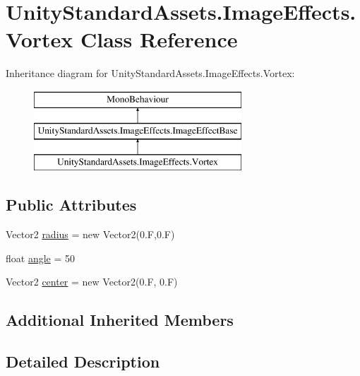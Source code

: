 \hypertarget{class_unity_standard_assets_1_1_image_effects_1_1_vortex}{}\section{Unity\+Standard\+Assets.\+Image\+Effects.\+Vortex Class Reference}
\label{class_unity_standard_assets_1_1_image_effects_1_1_vortex}
Inheritance diagram for Unity\+Standard\+Assets.\+Image\+Effects.\+Vortex\+:\begin{figure}[H]
\begin{center}
\leavevmode
\includegraphics[height=3.000000cm]{class_unity_standard_assets_1_1_image_effects_1_1_vortex}
\end{center}
\end{figure}
\subsection*{Public Attributes}
\begin{DoxyCompactItemize}
\item 
Vector2 \mbox{\hyperlink{class_unity_standard_assets_1_1_image_effects_1_1_vortex_a18d4f90d00b4bf29e009dfb6646a5945}{radius}} = new Vector2(0.\+F,0.\+F)
\item 
float \mbox{\hyperlink{class_unity_standard_assets_1_1_image_effects_1_1_vortex_a58c4a65228a790d11ee0cc53f4695ac5}{angle}} = 50
\item 
Vector2 \mbox{\hyperlink{class_unity_standard_assets_1_1_image_effects_1_1_vortex_aa82b55b306c932271da37a1f23ef9915}{center}} = new Vector2(0.\+F, 0.\+F)
\end{DoxyCompactItemize}
\subsection*{Additional Inherited Members}


\subsection{Detailed Description}


